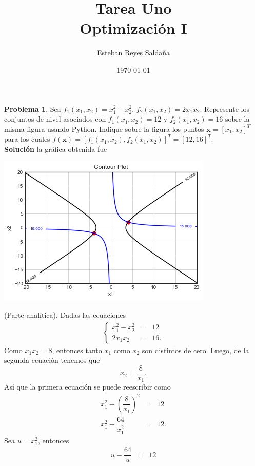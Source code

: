 \documentclass[12pt,letterpaper]{article}
\title{ \textbf{Tarea Uno} \\ Optimización I}
\author{Esteban Reyes Saldaña}
\date{\today}
\theoremstyle{definition}
\newtheorem{problm}{Problema}
\begin{document}
	
\maketitle 
\begin{problm}
	Sea $ f_1(x_1, x_2) = x_1^2 - x_2^2 $, $ f_2(x_1, x_2) = 2x_1 x_2 $. Represente los conjuntos de nivel asociados con $ f_1(x_1, x_2) = 12 $ y $ f_2(x_1, x_2) = 16 $ sobre la misma figura usando Python. Indique sobre la figura los puntos $ \textbf{x} = \left[ x_1, x_2 \right]^T $ para los cuales $ f(\textbf{x}) =  \left[f_1(x_1, x_2), f_2(x_1, x_2)\right]^T = \left[12, 16 \right]^T $.
	\\
	\textbf{Solución} la gráfica obtenida fue
	\begin{center}
		\includegraphics[width=0.7\linewidth]{contour}
	\end{center}
	(Parte analítica). Dadas las ecuaciones
	\begin{eqnarray}\label{sistema}
		\left\{\begin{matrix}
			x_1^2 - x_2^2 & = & 12 \\
			2x_1 x_2      & = & 16.
		\end{matrix}\right.
	\end{eqnarray}
	Como $ x_1 x_2 = 8 $, entonces tanto $ x_1 $ como $ x_2 $ son distintos de cero. Luego, de la segunda ecuación tenemos que
	\begin{equation}\label{equisdos}
		x_2 = \dfrac{8}{x_1}.
	\end{equation}
	Así que la primera ecuación se puede reescribir como
	\begin{eqnarray*}
		x_1^2 - \left( \dfrac{8}{x_1} \right)^2 & = & 12 \\
		x_1^2 - \dfrac{64}{x_1^2} 				& = & 12.		
	\end{eqnarray*}
	Sea $ u = x_1^2 $, entonces
	\begin{eqnarray*}
		u - \dfrac{64}{u} & = & 12 \\

\end{eqnarray*}
\end{problm}
\end{document}
